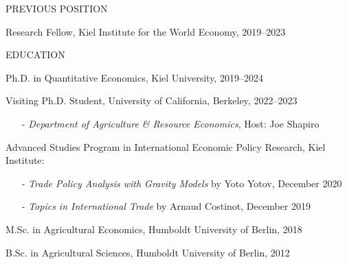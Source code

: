 \documentclass{article}
\begin{document}

\begin{minipage}[t]{0.12\textwidth}
    {\selectfont PREVIOUS POSITION} \\
\end{minipage}
\hspace{5mm}
\begin{minipage}[t]{0.8\textwidth} 
    Research Fellow, Kiel Institute for the World Economy, 2019--2023 \par
\end{minipage}
\medskip


\begin{minipage}[t]{0.12\textwidth}
    {\selectfont EDUCATION} \\
\end{minipage}
\hspace{5mm}
\begin{minipage}[t]{0.8\textwidth}
    Ph.D. in Quantitative Economics, Kiel University, 2019--2024 \par
    Visiting Ph.D. Student, University of California, Berkeley, 2022--2023 \par
        \begin{itemize}
        \item[-] \textit{Department of Agriculture \& Resource Economics}, Host: Joe Shapiro
    \end{itemize}
    Advanced Studies Program in International Economic Policy Research, Kiel Institute:
    \begin{itemize}
        \item[-] \textit{Trade Policy Analysis with Gravity Models} by Yoto Yotov, December 2020 
        \item[-] \textit{Topics in International Trade} by Arnaud Costinot, December 2019
    \end{itemize}
    M.Sc. in Agricultural Economics, Humboldt University of Berlin, 2018 \par
    B.Sc. in Agricultural Sciences, Humboldt University of Berlin, 2012 \par
\end{minipage}
\medskip

\end{document}
